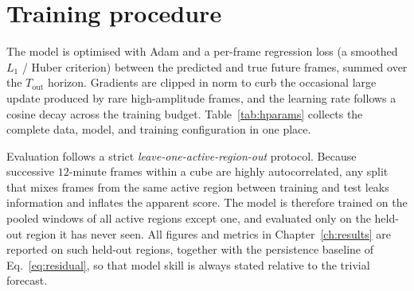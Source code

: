 \section{Training procedure}
\label{sec:training}

The model is optimised with Adam and a per-frame regression loss (a smoothed
$L_1$ / Huber criterion) between the predicted and true future frames, summed
over the $T_{\text{out}}$ horizon. Gradients are clipped in norm to curb the
occasional large update produced by rare high-amplitude frames, and the learning
rate follows a cosine decay across the training budget. Table~\ref{tab:hparams}
collects the complete data, model, and training configuration in one place.



Evaluation follows a strict \emph{leave-one-active-region-out} protocol. Because
successive $12$-minute frames within a cube are highly autocorrelated, any split
that mixes frames from the same active region between training and test leaks
information and inflates the apparent score. The model is therefore trained on
the pooled windows of all active regions except one, and evaluated only on the
held-out region it has never seen. All figures and metrics in
Chapter~\ref{ch:results} are reported on such held-out regions, together with the
persistence baseline of Eq.~\eqref{eq:residual}, so that model skill is always
stated relative to the trivial forecast.

